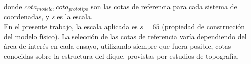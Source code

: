 donde \textsl{$cota_{modelo}, cota_{prototipo}$} son las cotas de referencia para cada sistema de coordenadas, y \textsl{s} es la escala. \\

En el presente trabajo, la escala aplicada es $s=65$ (propiedad de construcción del modelo físico). La selección de las cotas de referencia varía dependiendo del área de interés en cada ensayo, utilizando siempre que fuera posible, cotas conocidas sobre la estructura del dique, provistas por estudios de topografía.

